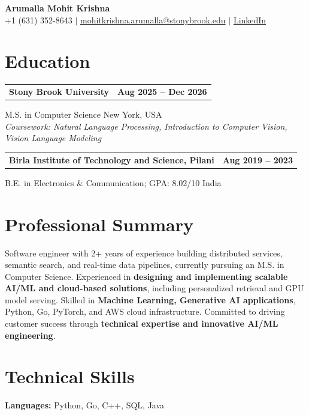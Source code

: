 \documentclass[letterpaper,10pt]{article}
\makeatletter
\newcommand{\entry}[2]{%
  \noindent
  \begin{tabularx}{\linewidth}
    {@{}>{\raggedright\arraybackslash}X@{\hspace{6pt}}r@{}}
    \textbf{#1} & #2
  \end{tabularx}\par
}
\makeatother
\begin{document}
\begin{center}
    {\LARGE\bfseries Arumalla Mohit Krishna}\\[3pt]
    +1 (631) 352-8643 $|$
    \href{mailto:mohitkrishna.arumalla@stonybrook.edu}
    {mohitkrishna.arumalla@stonybrook.edu} $|$
    \href{https://linkedin.com/in/mohit-krishna-arumalla}
    {LinkedIn}
\end{center}
\vspace{-8pt}

\section{Education}

\entry
  {\textbf{Stony Brook University}}
  {\textbf{Aug 2025 -- Dec 2026}}

M.S. in Computer Science \hfill New York, USA\\
\textit{
Coursework: Natural Language Processing,
Introduction to Computer Vision, Vision Language Modeling
}
\vspace{3pt}

\entry
  {\textbf{Birla Institute of Technology and Science, Pilani}}
  {\textbf{Aug 2019 -- 2023}}

B.E. in Electronics \& Communication; GPA: 8.02/10 \hfill India
\section{Professional Summary}

Software engineer with 2+ years of experience building distributed services,
semantic search, and real-time data pipelines, currently pursuing an M.S. in Computer
Science. Experienced in \textbf{designing and implementing scalable AI/ML and cloud-based solutions}, including personalized
retrieval and GPU model serving. Skilled in \textbf{Machine Learning, Generative AI applications}, Python, Go, PyTorch, and AWS cloud infrastructure.
Committed to driving customer success through \textbf{technical expertise and innovative AI/ML engineering}.

\section{Technical Skills}

\textbf{Languages:}
Python, Go, C++, SQL, Java\\
\end{document}
